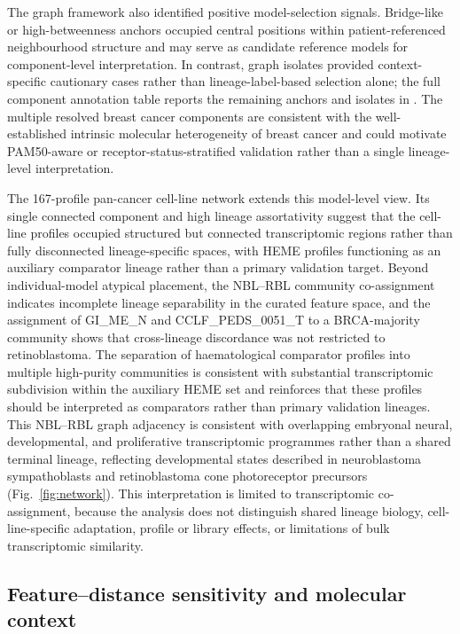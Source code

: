 The graph framework also identified positive model-selection signals.
Bridge-like or high-betweenness anchors occupied central positions within
patient-referenced neighbourhood structure and may serve as candidate reference
models for component-level interpretation. In contrast, graph isolates provided
context-specific cautionary cases rather than lineage-label-based selection
alone; the full component annotation table reports the remaining anchors and
isolates in . The multiple resolved
breast cancer components are consistent with the well-established intrinsic
molecular heterogeneity of breast cancer
\citep{Parker2009PAM50,Perou2000Portraits} and could motivate PAM50-aware or
receptor-status-stratified validation rather than a single lineage-level
interpretation.


The 167-profile pan-cancer cell-line network extends this model-level view. Its
single connected component and high lineage assortativity suggest that the
cell-line profiles occupied structured but connected transcriptomic regions
rather than fully disconnected lineage-specific spaces, with HEME profiles
functioning as an auxiliary comparator lineage rather than a primary validation
target. Beyond individual-model atypical placement, the NBL--RBL community
co-assignment indicates incomplete lineage separability in the curated feature
space, and the assignment of GI\_ME\_N and CCLF\_PEDS\_0051\_T to a
BRCA-majority community shows that cross-lineage discordance was not restricted
to retinoblastoma. The separation of haematological comparator profiles into
multiple high-purity communities is consistent with substantial transcriptomic
subdivision within the auxiliary HEME set and reinforces that these profiles
should be interpreted as comparators rather than primary validation lineages.
This NBL--RBL graph adjacency is consistent with overlapping embryonal neural,
developmental, and proliferative transcriptomic programmes rather than a shared
terminal lineage, reflecting developmental states described in neuroblastoma
sympathoblasts and retinoblastoma cone photoreceptor precursors
\citep{Jansky2021NeuroblastomaDevelopment,Yang2021RetinoblastomaSingleCell}
(Fig.~\ref{fig:network}). This interpretation is limited to transcriptomic
co-assignment, because the analysis does not distinguish shared lineage biology,
cell-line-specific adaptation, profile or library effects, or limitations of
bulk transcriptomic similarity.

\subsection{Feature--distance sensitivity and molecular context}

